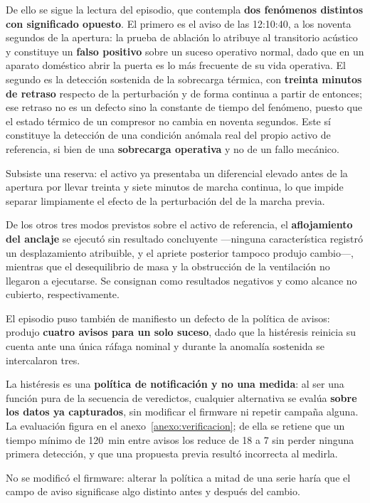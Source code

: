 De ello se sigue la lectura del episodio, que contempla \textbf{dos fenómenos distintos con
significado opuesto}. El primero es el aviso de las \mbox{12:10:40}, a los noventa segundos de la
apertura: la prueba de ablación lo atribuye al transitorio acústico y constituye un
\textbf{falso positivo} sobre un suceso operativo normal, dado que en un aparato doméstico abrir
la puerta es lo más frecuente de su vida operativa. El segundo es la detección sostenida de la
sobrecarga térmica, con \textbf{treinta minutos de retraso} respecto de la perturbación y de
forma continua a partir de entonces; ese retraso no es un defecto sino la constante de tiempo del
fenómeno, puesto que el estado térmico de un compresor no cambia en noventa segundos. Este sí
constituye la detección de una condición anómala real del propio activo de referencia, si bien de
una \textbf{sobrecarga operativa} y no de un fallo mecánico.

Subsiste una reserva: el activo ya presentaba un diferencial elevado antes de la apertura por
llevar treinta y siete minutos de marcha continua, lo que impide separar limpiamente el efecto de
la perturbación del de la marcha previa.

De los otros tres modos previstos sobre el activo de referencia, el \textbf{aflojamiento del
anclaje} se ejecutó sin resultado concluyente —ninguna característica registró un desplazamiento
atribuible, y el apriete posterior tampoco produjo cambio—, mientras que el desequilibrio de masa y
la obstrucción de la ventilación no llegaron a ejecutarse. Se consignan como resultados negativos y
como alcance no cubierto, respectivamente.

El episodio puso también de manifiesto un defecto de la política de avisos: produjo
\textbf{cuatro avisos para un solo suceso}, dado que la histéresis reinicia su cuenta ante una
única ráfaga nominal y durante la anomalía sostenida se intercalaron tres.

La histéresis es una \textbf{política de notificación y no una medida}: al ser una función pura
de la secuencia de veredictos, cualquier alternativa se evalúa \textbf{sobre los datos ya
capturados}, sin modificar el firmware ni repetir campaña alguna. La evaluación figura en el
anexo~\ref{anexo:verificacion}; de ella se retiene que un tiempo mínimo de \mbox{120 min} entre
avisos los reduce de 18 a 7 sin perder ninguna primera detección, y que una propuesta previa
resultó incorrecta al medirla.

No se modificó el firmware: alterar la política a mitad de una serie haría que el campo de aviso
significase algo distinto antes y después del cambio.

